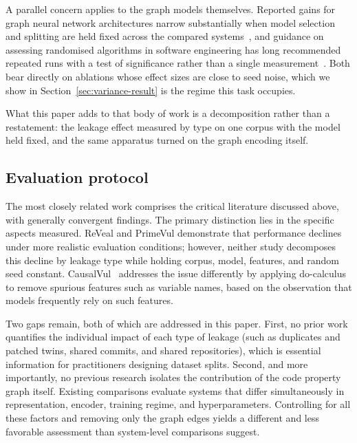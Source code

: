 A parallel concern applies to the graph models themselves. Reported gains for
graph neural network architectures narrow substantially when model selection and
splitting are held fixed across the compared systems~\citep{errica2020fair}, and
guidance on assessing randomised algorithms in software engineering has long
recommended repeated runs with a test of significance rather than a single
measurement~\citep{arcuri2011practical}. Both bear directly on ablations whose
effect sizes are close to seed noise, which we show in
Section~\ref{sec:variance-result} is the regime this task occupies.

What this paper adds to that body of work is a decomposition rather than a
restatement: the leakage effect measured by type on one corpus with the model
held fixed, and the same apparatus turned on the graph encoding itself.

\subsection{Evaluation protocol}
The most closely related work comprises the critical literature discussed above, with generally convergent findings. The primary distinction lies in the specific aspects measured. ReVeal and PrimeVul demonstrate that performance declines under more realistic evaluation conditions; however, neither study decomposes this decline by leakage type while holding corpus, model, features, and random seed constant. CausalVul~\citep{rahman2024causal} addresses the issue differently by applying do-calculus to remove spurious features such as variable names, based on the observation that models frequently rely on such features.

Two gaps remain, both of which are addressed in this paper. First, no prior work quantifies the individual impact of each type of leakage (such as duplicates and patched twins, shared commits, and shared repositories), which is essential information for practitioners designing dataset splits. Second, and more importantly, no previous research isolates the contribution of the code property graph itself. Existing comparisons evaluate systems that differ simultaneously in representation, encoder, training regime, and hyperparameters. Controlling for all these factors and removing only the graph edges yields a different and less favorable assessment than system-level comparisons suggest.